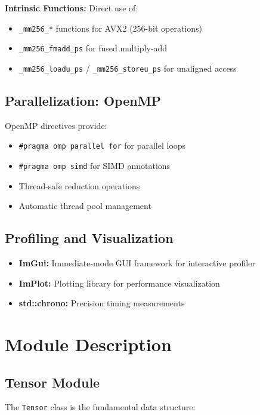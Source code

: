 \documentclass[12pt,oneside,a4paper]{report}
\begin{document}
\textbf{Intrinsic Functions:} Direct use of:
\begin{itemize}
    \item \texttt{\_mm256\_*} functions for AVX2 (256-bit operations)
    \item \texttt{\_mm256\_fmadd\_ps} for fused multiply-add
    \item \texttt{\_mm256\_loadu\_ps} / \texttt{\_mm256\_storeu\_ps} for unaligned access
\end{itemize}

\subsection{Parallelization: OpenMP}

OpenMP directives provide:
\begin{itemize}
    \item \texttt{\#pragma omp parallel for} for parallel loops
    \item \texttt{\#pragma omp simd} for SIMD annotations
    \item Thread-safe reduction operations
    \item Automatic thread pool management
\end{itemize}

\subsection{Profiling and Visualization}

\begin{itemize}
    \item \textbf{ImGui:} Immediate-mode GUI framework for interactive profiler
    \item \textbf{ImPlot:} Plotting library for performance visualization
    \item \textbf{std::chrono:} Precision timing measurements
\end{itemize}

\section{Module Description}

\subsection{Tensor Module}

The \texttt{Tensor} class is the fundamental data structure:
\end{document}
